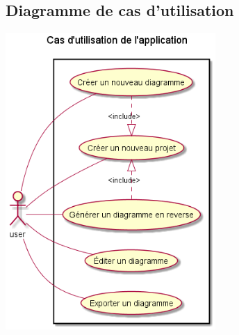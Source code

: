 \documentclass[hidelinks, 10pt,a4paper]{article}
\begin{document}
\subsection{Diagramme de cas d’utilisation}
\begin{center}
    \includegraphics[width=8cm]{imgSTB/uc_general.png}
\end{center}
\newpage
\end{document}
